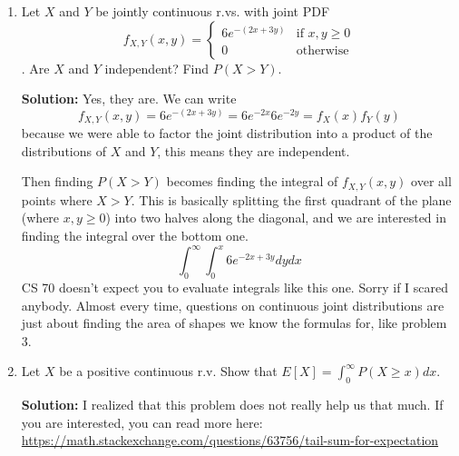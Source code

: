 \documentclass{article}
\newenvironment{solution}{

            \color{blue} \smallskip \textbf{Solution:}}{}
\begin{document}
\begin{enumerate}
\begin{solution}
            Then this comes down to comparing areas. The area of where $X + Y < 1$ is $\frac{1}{2}$, while for $X \leq \frac{1}{2} \cup Y \leq \frac{1}{2}$
        \end{solution}
        \item Let $X$ and $Y$ be jointly continuous r.vs. with joint PDF \[
            f_{X,Y}(x, y) = \begin{cases}
                6e^{-(2x+3y)} & \text{if } x, y \geq 0 \\
                0 & \text{otherwise}
            \end{cases}
        \].
        Are $X$ and $Y$ independent? Find $P(X > Y)$.
        \begin{solution}
            Yes, they are. We can write \[
                f_{X,Y}(x, y) = 6e^{-(2x+3y)} = 6e^{-2x} 6e^{-2y} = f_X(x) f_Y(y)
            \]
            because we were able to factor the joint distribution into a product of the distributions of $X$ and $Y$, this means they are independent.

            Then finding $P(X > Y)$ becomes finding the integral of $f_{X, Y}(x, y)$ over all points where $X > Y$. This is basically splitting the first quadrant of the plane (where $x, y \geq 0$) into two halves along the diagonal, and we are interested in
            finding the integral over the bottom one. \[
                \int_{0}^\infty \int_{0}^x 6e^{-2x + 3y} dy dx 
            \]
            CS 70 doesn't expect you to evaluate integrals like this one. Sorry if I scared anybody. Almost every time, questions on continuous joint distributions are just about finding the area of
            shapes we know the formulas for, like problem 3.
        \end{solution}
        \item Let $X$ be a positive continuous r.v. Show that $E[X] = \int_{0}^\infty P(X \geq x) dx$.
        \begin{solution}
        I realized that this problem does not really help us that much. If you are interested, you can read more here: \url{https://math.stackexchange.com/questions/63756/tail-sum-for-expectation}
        \end{solution}
    \end{enumerate}
    
\end{document}
